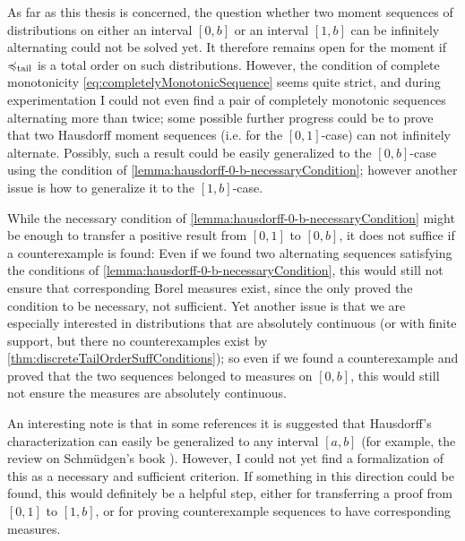 \documentclass[a4paper]{scrreprt}
\begin{document}
    As far as this thesis is concerned, the question whether two moment sequences of distributions on either an interval $[0, b]$ or an interval $[1, b]$ can be infinitely alternating could not be solved yet. It therefore remains open for the moment if $\preccurlyeq_{\text{tail}}$ is a total order on such distributions.
    However, the condition of complete monotonicity \eqref{eq:completelyMonotonicSequence} seems quite strict, and during experimentation I could not even find a pair of completely monotonic sequences alternating more than twice; some possible further progress could be to prove that two Hausdorff moment sequences (i.e. for the $[0, 1]$-case) can not infinitely alternate. Possibly, such a result could be easily generalized to the $[0, b]$-case using the condition of \ref{lemma:hausdorff-0-b-necessaryCondition}; however another issue is how to generalize it to the $[1, b]$-case.
    
    While the necessary condition of \ref{lemma:hausdorff-0-b-necessaryCondition} might be enough to transfer a positive result from $[0, 1]$ to $[0, b]$, it does not suffice if a counterexample is found: Even if we found two alternating sequences satisfying the conditions of \ref{lemma:hausdorff-0-b-necessaryCondition}, this would still not ensure that corresponding Borel measures exist, since the only proved the condition to be necessary, not sufficient.
    Yet another issue is that we are especially interested in distributions that 
    are absolutely continuous (or with finite support, but there no counterexamples exist by \ref{thm:discreteTailOrderSuffConditions}); so even if we found a counterexample and proved that the two sequences belonged to measures on $[0, b]$, this would still not ensure the measures are absolutely continuous.
    
    An interesting note is that in some references it is suggested that Hausdorff's characterization can easily be generalized to any interval $[a, b]$ (for example, the review \cite{bib:bultheelBookReviewMomentProblem} on Schmüdgen's book \cite{bib:schmuedgenTheMomentProblem}).
    However, I could not yet find a formalization of this as a necessary and sufficient criterion. If something in this direction could be found, this would definitely be a helpful step, either for transferring a proof from $[0, 1]$ to $[1, b]$, or for proving counterexample sequences to have corresponding measures.
     
\end{document}

